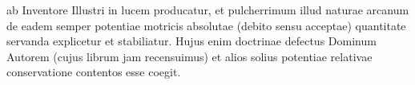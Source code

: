 %
ab Inventore Illustri in lucem producatur, et pulcherrimum illud naturae arcanum 
%
de eadem semper potentiae motricis absolutae\protect{} (debito sensu acceptae) 
%
quantitate\protect{} servanda explicetur et stabiliatur. 
%
Hujus enim doctrinae defectus Dominum 
%
\protect{}Autorem 
%
(cujus librum jam recensuimus) 
%
et alios solius potentiae relativae\protect{} conservatione\protect{} contentos esse coegit.
%
\pend
\count{}%
\count{}%
\count{}